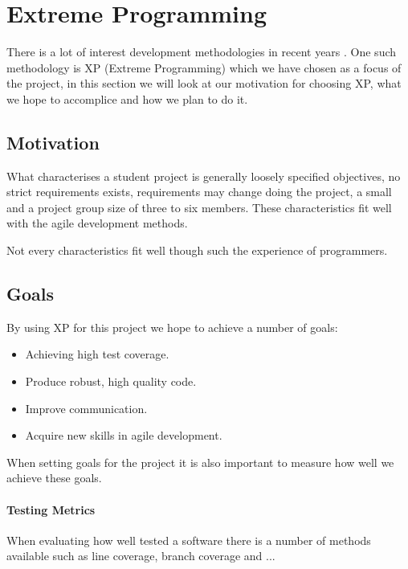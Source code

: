 \section{Extreme Programming}
There is a lot of interest development methodologies in recent years . One such methodology is XP (Extreme Programming) which we have chosen as a focus of the project, in this section we will look at our motivation for choosing XP, what we hope to accomplice and how we plan to do it.
	
\subsection{Motivation}
What characterises a student project is generally loosely specified objectives, no strict requirements exists, requirements may change doing the project, a small and a project group size of three to six members. These characteristics fit well with the agile development methods. 

Not every characteristics fit well though such the experience of programmers.
\subsection{Goals}
By using XP for this project we hope to achieve a number of goals:
\begin{itemize}
\item Achieving high test coverage.
\item Produce robust, high quality code.
\item Improve communication.
\item Acquire new skills in agile development.
\end{itemize}

When setting goals for the project it is also important to measure how well we achieve these goals. 
\paragraph{Testing Metrics}
When evaluating how well tested a software there is a number of methods available such as line coverage, branch coverage and ...

